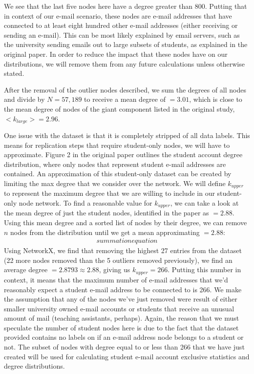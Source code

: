 \documentclass[a4paper]{article}
\begin{document}
\begin{multicols}{2}
We see that the last five nodes here have a degree greater than \(800\). Putting that in context of our e-mail scenario, these nodes are e-mail addresses that have connected to at least eight hundred other e-mail addresses (either receiving or sending an e-mail). This can be most likely explained by email servers, such as the university sending emails out to large subsets of students, as explained in the original paper. In order to reduce the impact that these nodes have on our distributions, we will remove them from any future calculations unless otherwise stated.

After the removal of the outlier nodes described, we sum the degrees of all nodes and divide by \(N = 57,189\) to receive a mean degree of \(< k >=3.01\), which is close to the mean degree of nodes of the giant component listed in the original study, \(< k_{large} > = 2.96\).

One issue with the dataset is that it is completely stripped of all data labels. This means for replication steps that require student-only nodes, we will have to approximate. Figure 2 in the original paper outlines the student account degree distribution, where only nodes that represent student e-mail addresses are contained. An approximation of this student-only dataset can be created by limiting the max degree that we consider over the network. We will define \(k_{upper}\) to represent the maximum degree that we are willing to include in our student-only node network. To find a reasonable value for \(k_{upper}\), we can take a look at the mean degree of just the student nodes, identified in the paper as \(< k> =2.88\). Using this mean degree and a sorted list of nodes by their degree, we can remove \(n\) nodes from the distribution until we get a mean approximating \(< k> =2.88\):
\begin{align*}
summation equation
\end{align*} 
Using NetworkX, we find that removing the highest 27 entries from the dataset (22 more nodes removed than the 5 outliers removed previously), we find an average degree \(< k> = 2.8793 \approx 2.88\), giving us \(k_{upper} = 266\). Putting this number in context, it means that the maximum number of e-mail addresses that we'd reasonably expect a student e-mail address to be connected to is 266. We make the assumption that any of the nodes we've just removed were result of either smaller university owned e-mail accounts or students that receive an unusual amount of mail (teaching assistants, perhaps). Again, the reason that we must speculate the number of student nodes here is due to the fact that the dataset provided contains no labels on if an e-mail address node belongs to a student or not. The subset of nodes with degree equal to or less than 266 that we have just created will be used for calculating student e-mail account exclusive statistics and degree distributions.


\end{multicols}
\end{document}

